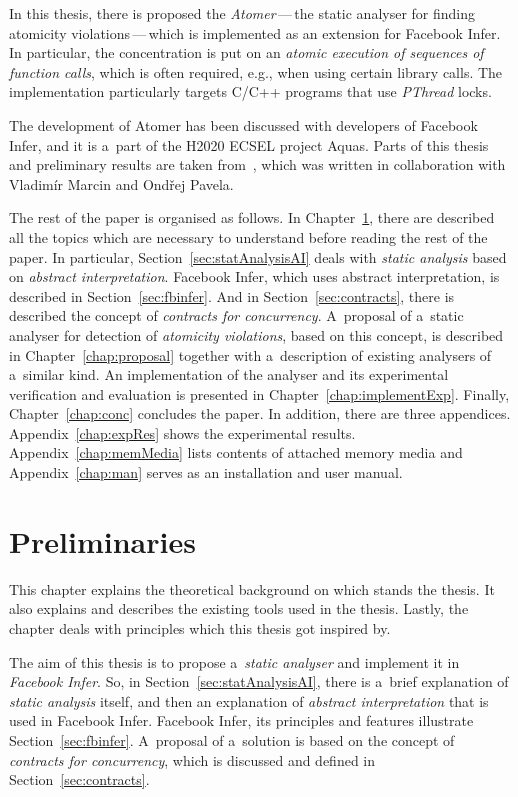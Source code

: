 In this thesis, there is proposed the \emph{Atomer}\,---\,the static 
analyser for finding atomicity violations\,---\,which is implemented as 
an extension for Facebook Infer. In particular, the concentration is put 
on an \emph{atomic execution of sequences of function calls}, which is often
required, e.g., when using certain library calls. The implementation
particularly targets C/C++ programs that use \emph{PThread} locks.

The development of Atomer has been discussed with developers of
Facebook Infer, and it is a~part of the H2020 ECSEL project Aquas. Parts
of this thesis and preliminary results are taken from~\cite{excel2019FBInfer},
which was written in collaboration with Vladimír Marcin and Ondřej Pavela.

The rest of the paper is organised as follows. In
Chapter~\ref{chap:prelim}, there are described all the topics
which are necessary to understand before reading the rest of the paper. In
particular, Section~\ref{sec:statAnalysisAI} deals with
\emph{static analysis} based on \emph{abstract interpretation}.
Facebook Infer, which uses abstract interpretation, is described in
Section~\ref{sec:fbinfer}. And in Section~\ref{sec:contracts}, there is
described the concept of \emph{contracts for concurrency}. A~proposal of
a~static analyser for detection of \emph{atomicity violations}, based on this
concept, is described in Chapter~\ref{chap:proposal} together with
a~description of existing analysers of a~similar kind. An implementation
of the analyser and its experimental verification and evaluation is
presented in Chapter~\ref{chap:implementExp}. Finally, Chapter~\ref{chap:conc}
concludes the paper. In addition, there are three appendices.
Appendix~\ref{chap:expRes} shows the experimental results.
Appendix~\ref{chap:memMedia} lists contents of attached memory media and
Appendix~\ref{chap:man} serves as an installation and user manual.



\chapter{Preliminaries}
\label{chap:prelim}

This chapter explains the theoretical background on which stands the
thesis. It also explains and describes the existing tools used in the
thesis. Lastly, the chapter deals with principles which this thesis
got inspired by.

The aim of this thesis is to propose a~\emph{static analyser} and implement
it in \emph{Facebook Infer}. So, in Section~\ref{sec:statAnalysisAI},
there is a~brief explanation of \emph{static analysis} itself, and then an
explanation of \emph{abstract interpretation} that is used in Facebook Infer.
Facebook Infer, its principles and features illustrate
Section~\ref{sec:fbinfer}. A~proposal of a~solution is based on the
concept of \emph{contracts for concurrency}, which is discussed and defined
in Section~\ref{sec:contracts}.


